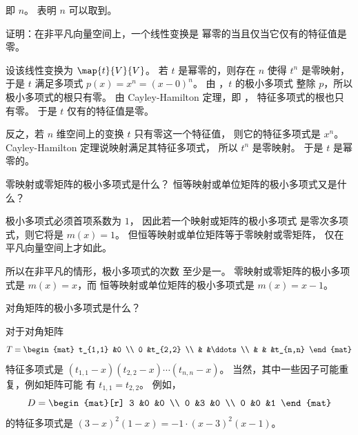 \begin{exercises}
\begin{answer}
      即 \( n \)。
       表明 \( n \) 可以取到。
    \end{answer}
   \recommended \item 
     证明：在非平凡向量空间上，一个线性变换是 
     幂零的当且仅当它仅有的特征值是零。
     \begin{answer}
       设该线性变换为 $\map{t}{V}{V}$。
       若 $t$ 是幂零的，则存在 $n$ 使得 $t^n$ 是零映射，
       于是 $t$ 满足多项式 $p(x)=x^n=(x-0)^n$。
       由 ，$t$ 的极小多项式 
       整除 $p$，所以极小多项式的根只有零。
       由 Cayley-Hamilton 定理，即 ，
       特征多项式的根也只有零。
       于是 $t$ 仅有的特征值是零。

       反之，若 \( n \) 维空间上的变换 \( t \) 只有零这一个特征值， 
       则它的特征多项式是 \( x^n \)。 
       Cayley-Hamilton 定理说映射满足其特征多项式，
       所以 \( t^n \) 是零映射。
       于是 $t$ 是幂零的。
     \end{answer}
   \item 
       零映射或零矩阵的极小多项式是什么？
       恒等映射或单位矩阵的极小多项式又是什么？
       \begin{answer}
         极小多项式必须首项系数为 $1$， 
         因此若一个映射或矩阵的极小多项式 
         是零次多项式，则它将是 $m(x)=1$。
         但恒等映射或单位矩阵等于零映射或零矩阵，
         仅在平凡向量空间上才如此。

         所以在非平凡的情形，极小多项式的次数
         至少是一。
         零映射或零矩阵的极小多项式是 \( m(x)=x \)，而
         恒等映射或单位矩阵的极小多项式是 \( m(x)=x-1 \)。 
       \end{answer}
   \recommended \item 
     对角矩阵的极小多项式是什么？
     \begin{answer}
       对于对角矩阵
       \begin{equation*}
          T=
          \begin{mat}
             t_{1,1}   &0        \\
             0         &t_{2,2}  \\
                       &        &\ddots  \\
                       &        &      &t_{n,n}
          \end{mat}
       \end{equation*}
       特征多项式是 
       $(t_{1,1}-x)(t_{2,2}-x)\cdots (t_{n,n}-x)$。     
       当然，其中一些因子可能重复，例如矩阵可能
       有 $t_{1,1}=t_{2,2}$。
       例如，
       \begin{equation*}
          D=
          \begin{mat}[r]
             3 &0 &0  \\
             0 &3 &0  \\
             0 &0 &1
          \end{mat}
       \end{equation*}
       的特征多项式是 \( (3-x)^2(1-x)=-1\cdot (x-3)^2(x-1) \)。 


\end{answer}
\end{exercises}
